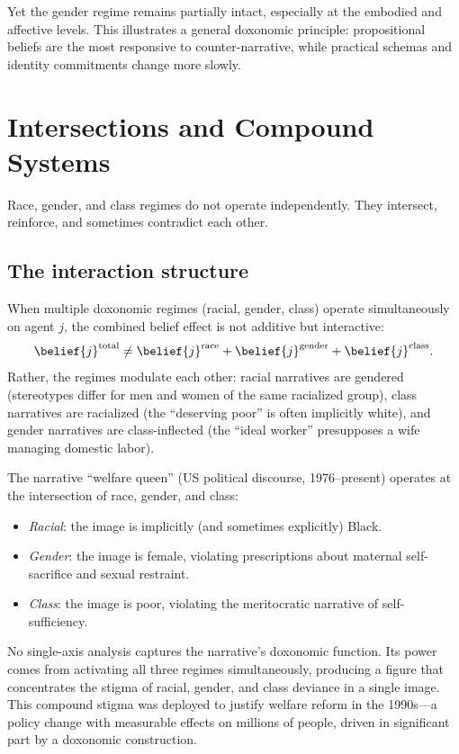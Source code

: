 Yet the gender regime remains partially intact, especially at the embodied and affective levels.
This illustrates a general doxonomic principle: propositional beliefs are the most responsive to counter-narrative, while practical schemas and identity commitments change more slowly.

\section{Intersections and Compound Systems}
\label{sec:ch24b-intersections}

Race, gender, and class regimes do not operate independently.
They intersect, reinforce, and sometimes contradict each other.

\subsection{The interaction structure}

\begin{proposition}
\label{prop:intersection}
When multiple doxonomic regimes (racial, gender, class) operate simultaneously on agent $j$, the combined belief effect is not additive but interactive:
\[
  \belief{j}^{\text{total}} \neq \belief{j}^{\text{race}} + \belief{j}^{\text{gender}} + \belief{j}^{\text{class}}.
\]
Rather, the regimes modulate each other: racial narratives are gendered (stereotypes differ for men and women of the same racialized group), class narratives are racialized (the ``deserving poor'' is often implicitly white), and gender narratives are class-inflected (the ``ideal worker'' presupposes a wife managing domestic labor).
\end{proposition}

\begin{example}
\label{ex:intersection}
The narrative ``welfare queen'' (US political discourse, 1976--present) operates at the intersection of race, gender, and class:
\begin{itemize}[nosep]
  \item \emph{Racial}: the image is implicitly (and sometimes explicitly) Black.
  \item \emph{Gender}: the image is female, violating prescriptions about maternal self-sacrifice and sexual restraint.
  \item \emph{Class}: the image is poor, violating the meritocratic narrative of self-sufficiency.
\end{itemize}
No single-axis analysis captures the narrative's doxonomic function.
Its power comes from activating all three regimes simultaneously, producing a figure that concentrates the stigma of racial, gender, and class deviance in a single image.
This compound stigma was deployed to justify welfare reform in the 1990s---a policy change with measurable effects on millions of people, driven in significant part by a doxonomic construction.
\end{example}

